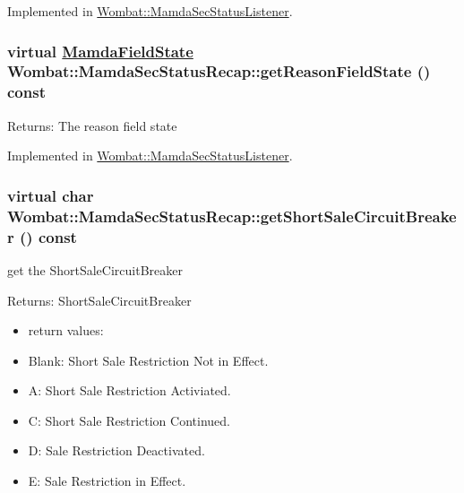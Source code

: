 Implemented in \hyperlink{classWombat_1_1MamdaSecStatusListener_71962c3d0ecd60a689324e68180b4e35}{Wombat::Mamda\-Sec\-Status\-Listener}.\hypertarget{classWombat_1_1MamdaSecStatusRecap_69999d63a62c1c13593814c3833a8473}{
\subsubsection[getReasonFieldState]{\setlength{\rightskip}{0pt plus 5cm}virtual \hyperlink{namespaceWombat_93aac974f2ab713554fd12a1fa3b7d2a}{Mamda\-Field\-State} Wombat::Mamda\-Sec\-Status\-Recap::get\-Reason\-Field\-State () const}}
\label{classWombat_1_1MamdaSecStatusRecap_69999d63a62c1c13593814c3833a8473}


\begin{Desc}
\item[Returns:]The reason field state \end{Desc}


Implemented in \hyperlink{classWombat_1_1MamdaSecStatusListener_b24a32e99973888050277f1cac1a23f5}{Wombat::Mamda\-Sec\-Status\-Listener}.\hypertarget{classWombat_1_1MamdaSecStatusRecap_80cb008d40d5435b74a3852926d3caa5}{
\subsubsection[getShortSaleCircuitBreaker]{\setlength{\rightskip}{0pt plus 5cm}virtual char Wombat::Mamda\-Sec\-Status\-Recap::get\-Short\-Sale\-Circuit\-Breaker () const}}
\label{classWombat_1_1MamdaSecStatusRecap_80cb008d40d5435b74a3852926d3caa5}


get the Short\-Sale\-Circuit\-Breaker 

\begin{Desc}
\item[Returns:]Short\-Sale\-Circuit\-Breaker \begin{itemize}
\item return values: \item Blank: Short Sale Restriction Not in Effect. \item A: Short Sale Restriction Activiated. \item C: Short Sale Restriction Continued. \item D: Sale Restriction Deactivated. \item E: Sale Restriction in Effect. \end{itemize}
\end{Desc}


